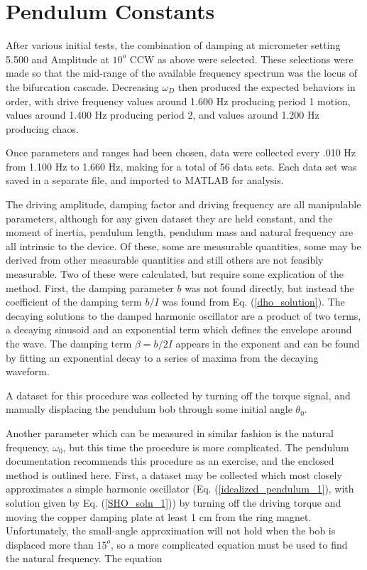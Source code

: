 \documentclass[12pt,twoside]{reedthesis}
\begin{document}
\section{Pendulum Constants}
\label{constants}

After various initial tests, the combination of damping at micrometer setting 5.500 and Amplitude at $10^o$ CCW as above were selected.  These selections were made so that the mid-range of the available frequency spectrum was the locus of the bifurcation cascade.  Decreasing $\omega_D$ then produced the expected behaviors in order, with drive frequency values around 1.600 Hz producing period 1 motion, values around 1.400 Hz  producing period 2, and values around 1.200 Hz  producing chaos.

Once parameters and ranges had been chosen, data were collected every .010 Hz from 1.100 Hz to 1.660 Hz, making for a total of 56 data sets.  Each data set was saved in a separate file, and imported to MATLAB for analysis.  


The driving amplitude, damping factor and driving frequency are all manipulable parameters, although for any given dataset they are held constant, and the moment of inertia, pendulum length, pendulum mass and natural frequency are all intrinsic to the device.  Of these, some are measurable quantities, some may be derived from other measurable quantities and still others are not feasibly measurable.  
Two of these were calculated, but require some explication of the method.  First, the damping parameter $b$ was not found directly, but instead the coefficient of the damping term $b/I$ was found from Eq. (\ref{dho_solution}).  The decaying solutions to the damped harmonic oscillator are a product of two terms, a decaying sinusoid and an exponential term which defines the envelope around the wave.  The damping term $\beta = b/2I$ appears in the exponent and can be found by fitting an exponential decay to a series of maxima from the decaying waveform.  

A dataset for this procedure was collected by turning off the torque signal, and manually displacing the pendulum bob through some initial angle $\theta_0$.  

Another parameter which can be measured in similar fashion is the natural frequency, $\omega_0$, but this time the procedure is more complicated.  The pendulum documentation recommends this  procedure as an exercise, and the enclosed method is outlined here.  First, a dataset may be collected which most closely approximates a simple harmonic oscillator (Eq. (\ref{idealized_pendulum_1}), with solution given by Eq. (\ref{SHO_soln_1})) by turning off the driving torque and moving the copper damping plate at least 1 cm from the ring magnet.  Unfortunately, the small-angle approximation will not hold when the bob is displaced more than $15^o$, so a more complicated equation must be used to find the natural frequency.  The equation
\end{document}
